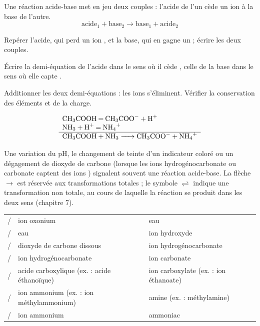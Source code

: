 \begin{propriete}
Une réaction acide-base met en jeu deux couples : l'acide de l'un cède un ion 
à la base de l'autre.
\[\text{acide}_1+\text{base}_2\longrightarrow\text{base}_1+\text{acide}_2\]
\end{propriete}
\begin{savoirfaire}
\begin{questions}
\item Repérer l'acide, qui perd un ion , et la base, qui en gagne un ; écrire les deux couples.
\item Écrire la demi-équation de l'acide dans le sens où il cède , celle de la base
dans le sens où elle capte .
\item Additionner les deux demi-équations : les ions  s'éliminent. Vérifier la conservation
des éléments et de la charge.
\end{questions}
\[\begin{array}{l}
\ce{CH3COOH = CH3COO- + H+}\\
\ce{NH3 + H+ = NH4+}\\\hline
\ce{CH3COOH + NH3 -> CH3COO- + NH4+}
\end{array}\]
\end{savoirfaire}
\begin{propriete}
Une variation du pH, le changement de teinte d'un indicateur coloré ou un dégagement de dioxyde
de carbone (lorsque les ions hydrogénocarbonate ou carbonate captent des ions ) signalent
souvent une réaction acide-base. La flèche $\longrightarrow$ est réservée aux transformations
totales ; le symbole $\rightleftharpoons$ indique une transformation non totale, au cours de laquelle
la réaction se produit dans les deux sens (chapitre 7).
\end{propriete}
\begin{center}\renewcommand{\arraystretch}{1.3}\small
\begin{tabularx}{\linewidth}{@{}lYY@{}}\toprule
{} &  & \\\midrule
{}/ & ion oxonium & eau\\
/ & eau & ion hydroxyde\\
/ & dioxyde de carbone dissous & ion hydrogénocarbonate\\
/ & ion hydrogénocarbonate & ion carbonate\\
/ & acide carboxylique (ex. : acide éthanoïque) & ion carboxylate (ex. : ion éthanoate)\\
/ & ion ammonium (ex. : ion méthylammonium) & amine (ex. : méthylamine)\\
/ & ion ammonium & ammoniac\\\bottomrule
\end{tabularx}\end{center}
